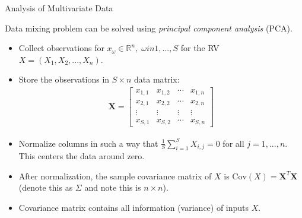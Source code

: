 \documentclass[9pt]{beamer}
\begin{document}
%
\begin{frame}{Analysis of Multivariate Data}

Data mixing problem can be solved using {\em principal component analysis} (PCA). 

\begin{itemize}
\item Collect observations for $x_\omega\in \mathbb{R}^n,\; \omega in 1,...,S$ for the RV $X=(X_1,X_2,...,X_n)$.  
\item Store the observations in $S\times n$ data matrix: 
\begin{align*}
\mathbf{X}=\left[\begin{array}{ccccccc}x_{1,1}&x_{1,2}&\cdots &x_{1,n}\\
x_{2,1}&x_{2,2}&\cdots &x_{2,n}\\
\vdots&\vdots&\vdots &\vdots\\
x_{S,1}&x_{S,2}&\cdots&x_{S,n}
\end{array}
\right]
\end{align*}
\item Normalize columns in such a way that $\frac{1}{S}\sum_{i=1}^SX_{i,j}=0$ for all $j=1,...,n$.  This centers the data around zero. 
\item After normalization, the sample covariance matrix of $X$ is $\textrm{Cov}(X)=\mathbf{X}^T\mathbf{X}$ (denote this as $\Sigma$ and note this is $n\times n$). 
\item Covariance matrix contains all information (variance) of inputs $X$. 


\end{itemize}


\end{frame}
\end{document}
